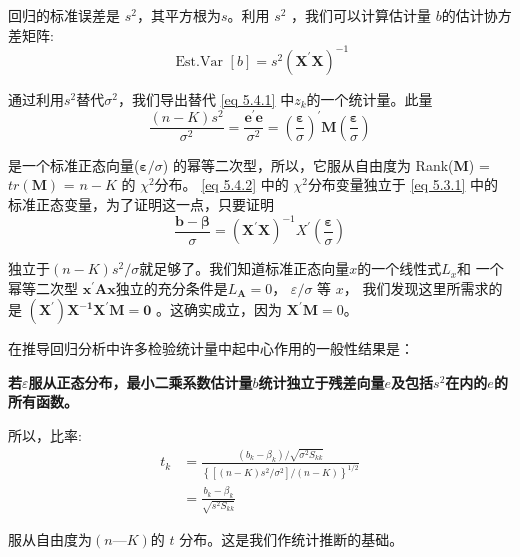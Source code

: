 \begin{mypty}
\begin{myproof}
        回归的标准误差是 $ s^{2} $，其平方根为$ s $。利用 $ s^{2} $ ，我们可以计算估计量 $ b $的估计协方差矩阵:
        $$ \text { Est.Var }[b]=s^{2}\left(\boldsymbol{X^{\prime} X}\right)^{-1} $$

        通过利用$ s^{2} $替代$\sigma^{2} $，我们导出替代 \ref{eq 5.4.1} 中$ z_{k} $的一个统计量。此量
        $$ \frac{(n-K) s^{2}}{\sigma^{2}}=\frac{\boldsymbol{e^{\prime} e}}{\sigma^{2}}
                =\left(\frac{\boldsymbol{\varepsilon}}{\sigma}\right)^{\prime} \boldsymbol{M}\left(\frac{\boldsymbol{\varepsilon}}{\sigma}\right) $$

        是一个标准正态向量($ \boldsymbol{\varepsilon} /\sigma $) 的幂等二次型，所以，它服从自由度为 Rank($ \boldsymbol{M} $)  = $tr( \boldsymbol{M} )$ 
        = $ n - K $ 的 $\chi^{2} $分布。
        \ref{eq 5.4.2} 中的 $ \chi^{2} $分布变量独立于 \ref{eq 5.3.1} 中的标准正态变量，为了证明这一点，只要证明
        \begin{equation}
            \frac{\boldsymbol{b-\beta}}{\sigma}
                =\left(\boldsymbol{X^{\prime} X}\right)^{-1} X^{\prime}\left(\frac{\boldsymbol{\varepsilon}}{\sigma}\right)
        \end{equation}

        独立于$ (n − K) s^{2} / \sigma $就足够了。我们知道标准正态向量$ x $的一个线性式$ L_{x} $和
        一个幂等二次型 $ \boldsymbol{x^{\prime}Ax} $独立的充分条件是$ L_{\boldsymbol{A}} = 0$， $\varepsilon /\sigma$ 等 
        $ x $， 我们发现这里所需求的是
        $\boldsymbol{{( X^{\prime} ) X ^{-1} X^{\prime}M = 0}}$ 。这确实成立，因为 $ \boldsymbol{X^{\prime} M }= 0 $。

        在推导回归分析中许多检验统计量中起中心作用的一般性结果是：

        {\bf 若$ \varepsilon $服从正态分布，最小二乘系数估计量$ b $统计独立于残差向量$ e $及包括$ s^{2} $在内的$ e $的所有函数。}

        所以，比率:
     \begin{equation}
        \begin{aligned}
            t_{k} &=\frac{\left(b_{k}-\beta_{k}\right) / \sqrt{\sigma^{2} S_{k k}}}{\left\{\left[(n-K) s^{2} / \sigma^{2}\right] /(n-K)\right\}^{1 / 2}} \\
            &=\frac{b_{k}-\beta_{k}}{\sqrt{s^{2} S_{k k}}}
        \end{aligned}
        \label{eq 5.4.4}
     \end{equation}

        服从自由度为$ (n—K) $的 $ t $ 分布。这是我们作统计推断的基础。

    \end{myproof}
\end{mypty}
